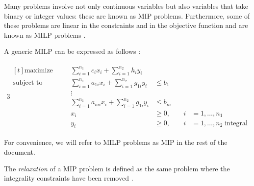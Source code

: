Many problems involve not only continuous variables but also variables that take binary or
integer values: these are known as \acrfull{MIP} problems. Furthermore, some of
these problems are linear in the constraints and in the objective function and are
known as \acrfull{MILP} problems
\cite{Edgar2001,Wolsey1998}.

A generic \acrshort{MILP} can be expressed as follows \cite{Conforti2016}:

\begin{alignat}{3}
	\label{eq:standard-form-milp}
	\begin{aligned}[t]
		\text{maximize}   &                                     & \sum_{i=1}^{n_{1} } c_{i}x_{i} +
		\sum_{i=1}^{n_{2} } h_{i}y_{i}                                                                                                                               \\
		\text{subject to} & \quad                               & \sum_{i=1}^{n_{1} } a_{1i}  x_{i} + \sum_{i=1}^{n_{2} } g_{1i}  y_{i} & \leq b_{1}       &         \\
		                  &                                     & \vdots                                                                                             \\
		                  &                                     & \sum_{i=1}^{n_{1} } a_{mi}  x_{i} + \sum_{i=1}^{n_{2} } g_{1i}  y_{i} & \leq b_{m}       &         \\
		                  &                                     & x_{i}
		                  & \geq 0,                             & \quad i                                                               & =1 ,\dots, n_{1}           \\
		                  &                                     & y_{i}                                                                 & \geq 0,          & \quad i
		                  & =1 ,\dots, n_{2} \; \text{integral}
	\end{aligned}
\end{alignat}

For convenience, we will refer to \acrshort{MILP} problems as \acrshort{MIP} in
the rest of the document.

The \emph{relaxation} of a \acrshort{MIP} problem is defined as the same
problem where the integrality constraints have been removed \cite{Edgar2001}.

